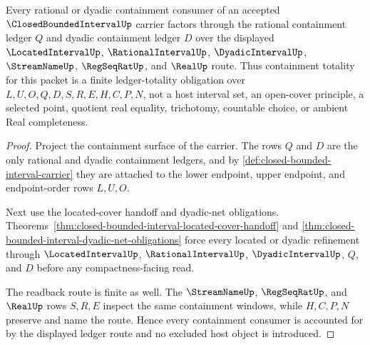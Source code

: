 \begin{theorem}
\label{thm:closed-bounded-interval-dyadic-containment-totality}
Every rational or dyadic containment consumer of an accepted $\ClosedBoundedIntervalUp$ carrier factors through the rational containment ledger $Q$ and dyadic containment ledger $D$ over the displayed $\LocatedIntervalUp$, $\RationalIntervalUp$, $\DyadicIntervalUp$, $\StreamNameUp$, $\RegSeqRatUp$, and $\RealUp$ route. Thus containment totality for this packet is a finite ledger-totality obligation over $L,U,O,Q,D,S,R,E,H,C,P,N$, not a host interval set, an open-cover principle, a selected point, quotient real equality, trichotomy, countable choice, or ambient Real completeness.
\end{theorem}
\begin{proof}
Project the containment surface of the carrier. The rows $Q$ and $D$ are the only rational and dyadic containment ledgers, and by \autoref{def:closed-bounded-interval-carrier} they are attached to the lower endpoint, upper endpoint, and endpoint-order rows $L,U,O$.

Next use the located-cover handoff and dyadic-net obligations. Theorems~\ref{thm:closed-bounded-interval-located-cover-handoff} and \ref{thm:closed-bounded-interval-dyadic-net-obligations} force every located or dyadic refinement through $\LocatedIntervalUp$, $\RationalIntervalUp$, $\DyadicIntervalUp$, $Q$, and $D$ before any compactness-facing read.

The readback route is finite as well. The $\StreamNameUp$, $\RegSeqRatUp$, and $\RealUp$ rows $S,R,E$ inspect the same containment windows, while $H,C,P,N$ preserve and name the route. Hence every containment consumer is accounted for by the displayed ledger route and no excluded host object is introduced.
\end{proof}

